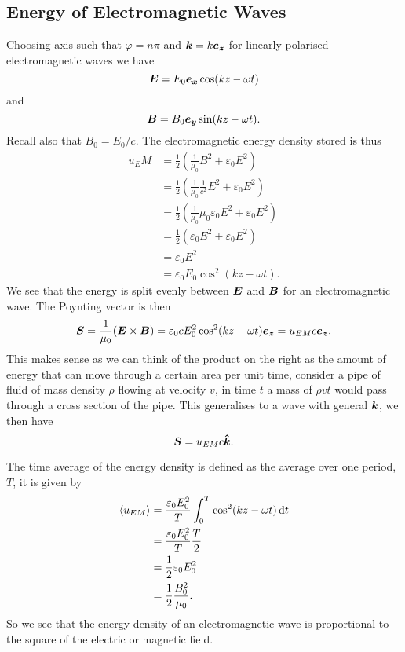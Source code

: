     \subsection{Energy of Electromagnetic Waves}
    Choosing axis such that \(\varphi = n\pi\) and \(\bm{k} = k\bm{e_{z}}\) for linearly polarised electromagnetic waves we have
    \[\bm{E} = E_0\bm{e_{x}}\cos(kz - \omega t)\]
    and
    \[\bm{B} = B_0\bm{e_{y}}\sin(kz - \omega t).\]
    Recall also that \(B_0 = E_0/c\).
    The electromagnetic energy density stored is thus
    \begin{align*}
        u_EM &= \frac{1}{2}\left(\frac{1}{\mu_0}B^2 + \varepsilon_0E^2\right)\\
        &= \frac{1}{2}\left(\frac{1}{\mu_0}\frac{1}{c^2}E^2 + \varepsilon_0E^2\right)\\
        &= \frac{1}{2}\left(\frac{1}{\mu_0}\mu_0\varepsilon_0E^2 + \varepsilon_0E^2\right)\\
        &= \frac{1}{2}\left(\varepsilon_0E^2 + \varepsilon_0E^2\right)\\
        &= \varepsilon_0E^2\\
        &= \varepsilon_0E_0\cos^2(kz - \omega t).
    \end{align*}
    We see that the energy is split evenly between \(\bm{E}\) and \(\bm{B}\) for an electromagnetic wave.
    The Poynting vector is then
    \[\bm{S} = \frac{1}{\mu_0}(\bm{E}\times\bm{B}) = \varepsilon_0cE_0^2\cos^2(kz - \omega t)\bm{e_{z}} = u_{EM}c\bm{e_{z}}.\]
    This makes sense as we can think of the product on the right as the amount of energy that can move through a certain area per unit time, consider a pipe of fluid of mass density \(\rho\) flowing at velocity \(v\), in time \(t\) a mass of \(\rho vt\) would pass through a cross section of the pipe.
    This generalises to a wave with general \(\bm{k}\), we then have
    \[\bm{S} = u_{EM}c\bm{\hat{k}}.\]
    
    The time average of the energy density is defined as the average over one period, \(T\), it is given by
    \begin{align*}
        \langle{u_{EM}}\rangle &= \frac{\varepsilon_0E_0^2}{T} \int_0^T \cos^2(kz - \omega t)\dd{t}\\
        &= \frac{\varepsilon_0E_0^2}{T}\frac{T}{2}\\
        &= \frac{1}{2}\varepsilon_0E_0^2\\
        &= \frac{1}{2}\frac{B_0^2}{\mu_0}.
    \end{align*}
    So we see that the energy density of an electromagnetic wave is proportional to the square of the electric or magnetic field.
    
